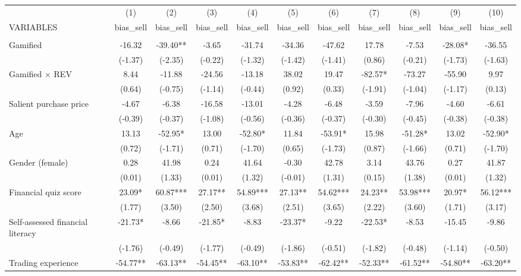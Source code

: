 \documentclass[]{article}
\begin{document}
\begin{tabular}{lcccccccccc} \hline
 & (1) & (2) & (3) & (4) & (5) & (6) & (7) & (8) & (9) & (10) \\
VARIABLES & bias\_sell & bias\_sell & bias\_sell & bias\_sell & bias\_sell & bias\_sell & bias\_sell & bias\_sell & bias\_sell & bias\_sell \\ \hline
 &  &  &  &  &  &  &  &  &  &  \\
Gamified & -16.32 & -39.40** & -3.65 & -31.74 & -34.36 & -47.62 & 17.78 & -7.53 & -28.08* & -36.55 \\
 & (-1.37) & (-2.35) & (-0.22) & (-1.32) & (-1.42) & (-1.41) & (0.86) & (-0.21) & (-1.73) & (-1.63) \\
Gamified $\times$ REV & 8.44 & -11.88 & -24.56 & -13.18 & 38.02 & 19.47 & -82.57* & -73.27 & -55.90 & 9.97 \\
 & (0.64) & (-0.75) & (-1.14) & (-0.44) & (0.92) & (0.33) & (-1.91) & (-1.04) & (-1.17) & (0.13) \\
Salient purchase price & -4.67 & -6.38 & -16.58 & -13.01 & -4.28 & -6.48 & -3.59 & -7.96 & -4.60 & -6.61 \\
 & (-0.39) & (-0.37) & (-1.08) & (-0.56) & (-0.36) & (-0.37) & (-0.30) & (-0.45) & (-0.38) & (-0.38) \\
Age & 13.13 & -52.95* & 13.00 & -52.80* & 11.84 & -53.91* & 15.98 & -51.28* & 13.02 & -52.90* \\
 & (0.72) & (-1.71) & (0.71) & (-1.70) & (0.65) & (-1.73) & (0.87) & (-1.66) & (0.71) & (-1.70) \\
Gender (female) & 0.28 & 41.98 & 0.24 & 41.64 & -0.30 & 42.78 & 3.14 & 43.76 & 0.27 & 41.87 \\
 & (0.01) & (1.33) & (0.01) & (1.32) & (-0.01) & (1.31) & (0.15) & (1.38) & (0.01) & (1.32) \\
Financial quiz score & 23.09* & 60.87*** & 27.17** & 54.89*** & 27.13** & 54.62*** & 24.23** & 53.98*** & 20.97* & 56.12*** \\
 & (1.77) & (3.50) & (2.50) & (3.68) & (2.51) & (3.65) & (2.22) & (3.60) & (1.71) & (3.17) \\
Self-assessed financial literacy & -21.73* & -8.66 & -21.85* & -8.83 & -23.37* & -9.22 & -22.53* & -8.53 & -15.45 & -9.86 \\
 & (-1.76) & (-0.49) & (-1.77) & (-0.49) & (-1.86) & (-0.51) & (-1.82) & (-0.48) & (-1.14) & (-0.50) \\
Trading experience & -54.77** & -63.13** & -54.45** & -63.10** & -53.83** & -62.42** & -52.33** & -61.52** & -54.80** & -63.20** \\

\end{tabular}
\end{document}
